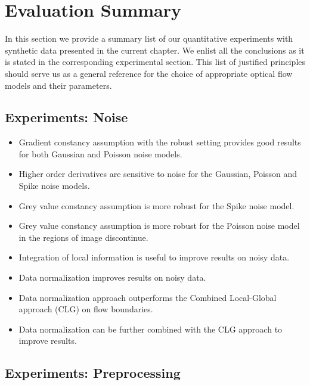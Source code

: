 \newpage

\section{Evaluation Summary}
\label{experiments_summary}

In this section we provide a summary list of our quantitative experiments with synthetic data presented in the current chapter. We enlist all the conclusions as it is stated in the corresponding experimental section. This list of justified principles should serve us as a general reference for the choice of appropriate optical flow models and their parameters.    

\subsection*{Experiments: Noise}

\begin{itemize}
	\item Gradient constancy assumption with the robust setting provides good results for both Gaussian and Poisson noise models.
	    
	\item Higher order derivatives are sensitive to noise for the Gaussian, Poisson and Spike noise models. 
	
	\item Grey value constancy assumption is more robust for the Spike noise model.
	
	\item Grey value constancy assumption is more robust for the Poisson noise model in the regions of image discontinue.
	
	\item Integration of local information is useful to improve results on noisy data.
	
	\item Data normalization improves results on noisy data.
	    
	\item Data normalization approach outperforms the Combined Local-Global approach (CLG) on flow boundaries.   
	
	\item Data normalization can be further combined with the CLG approach to improve results.
\end{itemize}
	
\subsection*{Experiments: Preprocessing}

